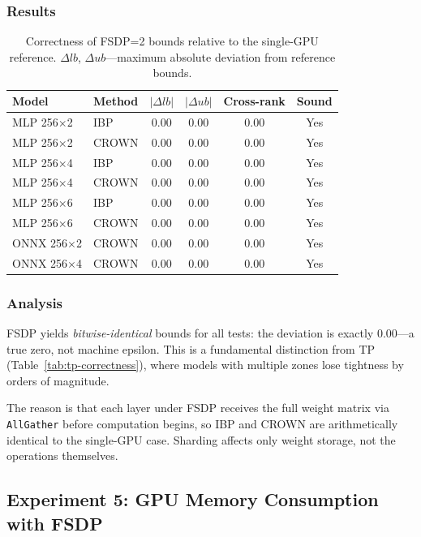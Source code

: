 \subsubsection{Results}

\begin{table}[htbp]
\centering
\caption{Correctness of FSDP=2 bounds relative to the single-GPU reference.
$\Delta lb$, $\Delta ub$---maximum absolute deviation from reference bounds.}
\label{tab:fsdp-correctness}
\begin{tabular}{llcccc}
\toprule
Model & Method & $|\Delta lb|$ & $|\Delta ub|$
    & Cross-rank & Sound \\
\midrule
MLP 256$\times$2 & IBP   & $0.00$ & $0.00$ & $0.00$ & Yes \\
MLP 256$\times$2 & CROWN & $0.00$ & $0.00$ & $0.00$ & Yes \\
MLP 256$\times$4 & IBP   & $0.00$ & $0.00$ & $0.00$ & Yes \\
MLP 256$\times$4 & CROWN & $0.00$ & $0.00$ & $0.00$ & Yes \\
MLP 256$\times$6 & IBP   & $0.00$ & $0.00$ & $0.00$ & Yes \\
MLP 256$\times$6 & CROWN & $0.00$ & $0.00$ & $0.00$ & Yes \\
ONNX 256$\times$2 & CROWN & $0.00$ & $0.00$ & $0.00$ & Yes \\
ONNX 256$\times$4 & CROWN & $0.00$ & $0.00$ & $0.00$ & Yes \\
\bottomrule
\end{tabular}
\end{table}

\subsubsection{Analysis}

FSDP yields \textit{bitwise-identical} bounds for all tests: the deviation is
exactly $0.00$---a true zero, not machine epsilon. This is a fundamental
distinction from TP (Table~\ref{tab:tp-correctness}), where models with multiple
zones lose tightness by orders of magnitude.

The reason is that each layer under FSDP receives the full weight matrix via
\texttt{AllGather} before computation begins, so IBP and CROWN are
arithmetically identical to the single-GPU case. Sharding affects only weight
storage, not the operations themselves.

\subsection{Experiment 5: GPU Memory Consumption with FSDP}

